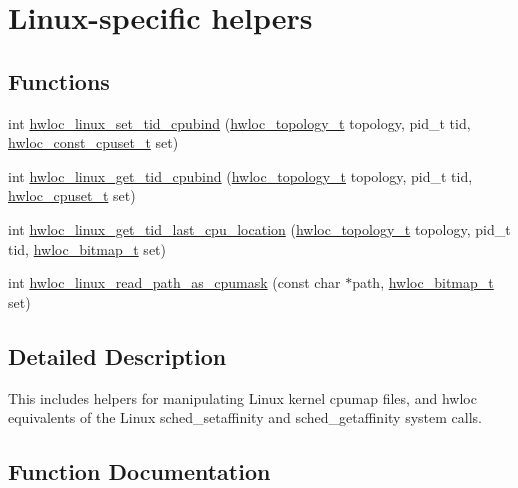 \hypertarget{a00214}{}\section{Linux-\/specific helpers}
\label{a00214}
\subsection*{Functions}
\begin{DoxyCompactItemize}
\item 
int \hyperlink{a00214_ga630e699c56b5f3d2e534b475944c216e}{hwloc\+\_\+linux\+\_\+set\+\_\+tid\+\_\+cpubind} (\hyperlink{a00186_ga9d1e76ee15a7dee158b786c30b6a6e38}{hwloc\+\_\+topology\+\_\+t} topology, pid\+\_\+t tid, \hyperlink{a00183_ga1f784433e9b606261f62d1134f6a3b25}{hwloc\+\_\+const\+\_\+cpuset\+\_\+t} set)
\item 
int \hyperlink{a00214_gaddcb985cb56337a4d6693cee72e7bf94}{hwloc\+\_\+linux\+\_\+get\+\_\+tid\+\_\+cpubind} (\hyperlink{a00186_ga9d1e76ee15a7dee158b786c30b6a6e38}{hwloc\+\_\+topology\+\_\+t} topology, pid\+\_\+t tid, \hyperlink{a00183_ga4bbf39b68b6f568fb92739e7c0ea7801}{hwloc\+\_\+cpuset\+\_\+t} set)
\item 
int \hyperlink{a00214_gacc7945c2d06c6db1e58f8fd953009134}{hwloc\+\_\+linux\+\_\+get\+\_\+tid\+\_\+last\+\_\+cpu\+\_\+location} (\hyperlink{a00186_ga9d1e76ee15a7dee158b786c30b6a6e38}{hwloc\+\_\+topology\+\_\+t} topology, pid\+\_\+t tid, \hyperlink{a00205_gaa3c2bf4c776d603dcebbb61b0c923d84}{hwloc\+\_\+bitmap\+\_\+t} set)
\item 
int \hyperlink{a00214_gaf72d83e273803226ce772973e37b85de}{hwloc\+\_\+linux\+\_\+read\+\_\+path\+\_\+as\+\_\+cpumask} (const char $\ast$path, \hyperlink{a00205_gaa3c2bf4c776d603dcebbb61b0c923d84}{hwloc\+\_\+bitmap\+\_\+t} set)
\end{DoxyCompactItemize}


\subsection{Detailed Description}
This includes helpers for manipulating Linux kernel cpumap files, and hwloc equivalents of the Linux sched\+\_\+setaffinity and sched\+\_\+getaffinity system calls. 

\subsection{Function Documentation}
\mbox{\label{a00214_gaddcb985cb56337a4d6693cee72e7bf94}} 
